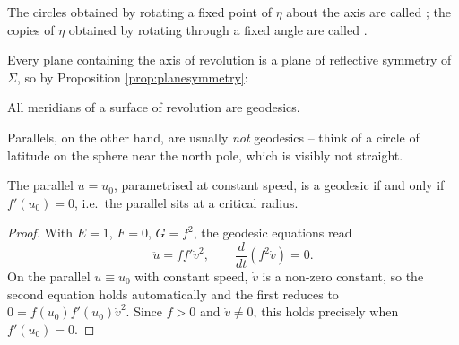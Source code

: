 \documentclass[a4paper]{scrartcl}
\begin{document}
\begin{definition}
    The circles obtained by rotating a fixed point of $\eta$ about the axis are called ; the copies of $\eta$ obtained by rotating through a fixed angle are called .
\end{definition}
\begin{center}
\end{center}

Every plane containing the axis of revolution is a plane of reflective symmetry of $\Sigma$, so by Proposition \ref{prop:planesymmetry}:

\begin{corollary}
    All meridians of a surface of revolution are geodesics.
\end{corollary}

Parallels, on the other hand, are usually \emph{not} geodesics -- think of a circle of latitude on the sphere near the north pole, which is visibly not straight.

\begin{lemma}
    The parallel $u = u_0$, parametrised at constant speed, is a geodesic if and only if $f'(u_0) = 0$, i.e.\ the parallel sits at a critical radius.
\end{lemma}
\begin{proof}
    With $E = 1$, $F = 0$, $G = f^2$, the geodesic equations read
    $$
    \ddot u = f f' \dot v^2, \qquad \frac{d}{dt}\left(f^2 \dot v\right) = 0.
    $$
    On the parallel $u \equiv u_0$ with constant speed, $\dot v$ is a non-zero constant, so the second equation holds automatically and the first reduces to $0 = f(u_0) f'(u_0) \dot v^2$. Since $f > 0$ and $\dot v \neq 0$, this holds precisely when $f'(u_0) = 0$.
\end{proof}
\end{document}
